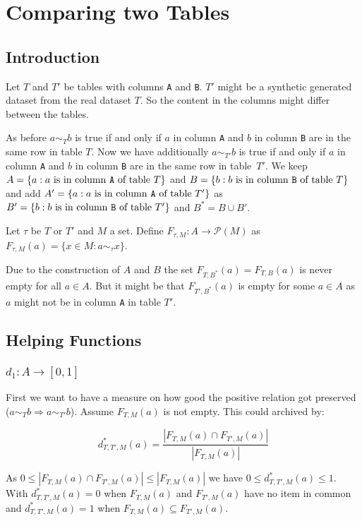 \section{Comparing two Tables}\label{ch:comparingTables}
\subsection{Introduction}

Let $T$ and $T'$ be tables with columns \texttt{A} and \texttt{B}.
$T'$ might be a synthetic generated dataset from the real dataset $T$.
So the content in the columns might differ between the tables.

As before $a \sim_T b$ is true if and only if $a$ in column \texttt{A} and $b$ in column \texttt{B} are in the same row in table $T$.
Now we have additionally $a \sim_{T'} b$ is true if and only if $a$ in column \texttt{A} and $b$ in column \texttt{B} are in the same row in table~$T'$.
We keep $A = \{ a : a \mbox{ is in column \texttt{A} of table } T \}$ and $B = \{ b : b \mbox{ is in column \texttt{B} of table } T \}$ and add $A' = \{ a : a \mbox{ is in column \texttt{A} of table } T' \}$ as $B' = \{ b : b \mbox{ is in column \texttt{B} of table } T' \}$ and $B^* = B \cup B'$.

Let $\tau$ be $T$ or $T'$ and $M$ a set.
Define $F_{\tau, M} : A \to \mathcal{P}(M)$ as $F_{\tau, M}(a) = \{ x \in M : a \sim_\tau x \}$.

Due to the construction of $A$ and $B$ the set $F_{T,B^*}(a) = F_{T,B}(a)$ is never empty for all $a \in A$.
But it might be that $F_{T',B^*}(a)$ is empty for some $a \in A$ as $a$ might not be in column \texttt{A} in table $T'$.


\subsection{Helping Functions}
\subsubsection{$d_1 : A \to [0,1]$}
First we want to have a measure on how good the positive relation got preserved ($a \sim_T b \Rightarrow a \sim_{T'} b$).
Assume $F_{T, M}(a)$ is not empty. 
This could archived by:

\[
  d^*_{T,T',M}(a) = 
    \frac{\left|F_{T, M}(a) \cap F_{T', M}(a)\right|}{|F_{T, M}(a)|}
\]


As $0 \leq \left|F_{T, M}(a) \cap F_{T', M}(a)\right| \leq |F_{T, M}(a)|$ we have $0 \leq d^*_{T, T', M}(a) \leq 1$.
With $d^*_{T, T', M}(a) = 0$ when $F_{T, M}(a)$ and $F_{T', M}(a)$ have no item in common
and $d^*_{T, T', M}(a) = 1$ when $F_{T, M}(a) \subseteq F_{T', M}(a)$.

